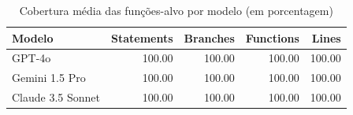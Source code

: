 \begin{table}[htbp]
\centering
\caption{Cobertura média das funções-alvo por modelo (em porcentagem)}
\label{tab:cobertura-modelos}
\begin{tabular}{lrrrr}
\toprule
Modelo & Statements & Branches & Functions & Lines \\
\midrule
GPT-4o & 100.00 & 100.00 & 100.00 & 100.00 \\
Gemini 1.5 Pro & 100.00 & 100.00 & 100.00 & 100.00 \\
Claude 3.5 Sonnet & 100.00 & 100.00 & 100.00 & 100.00 \\
\bottomrule
\end{tabular}
\end{table}
